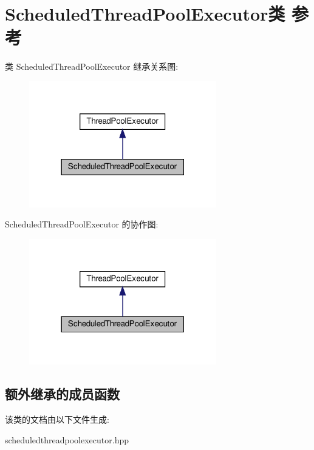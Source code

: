 \hypertarget{classScheduledThreadPoolExecutor}{}\section{Scheduled\+Thread\+Pool\+Executor类 参考}
\label{classScheduledThreadPoolExecutor}


类 Scheduled\+Thread\+Pool\+Executor 继承关系图\+:
\nopagebreak
\begin{figure}[H]
\begin{center}
\leavevmode
\includegraphics[width=231pt]{classScheduledThreadPoolExecutor__inherit__graph}
\end{center}
\end{figure}


Scheduled\+Thread\+Pool\+Executor 的协作图\+:
\nopagebreak
\begin{figure}[H]
\begin{center}
\leavevmode
\includegraphics[width=231pt]{classScheduledThreadPoolExecutor__coll__graph}
\end{center}
\end{figure}
\subsection*{额外继承的成员函数}


该类的文档由以下文件生成\+:\begin{DoxyCompactItemize}
\item 
scheduledthreadpoolexecutor.\+hpp\end{DoxyCompactItemize}
